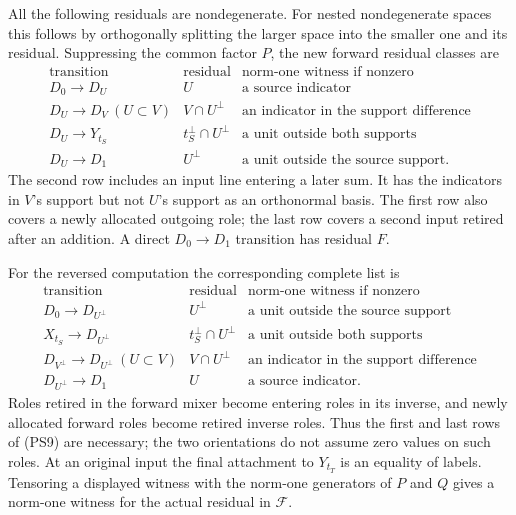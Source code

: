 All the following residuals are nondegenerate.  For nested nondegenerate
spaces this follows by orthogonally splitting the larger space into the
smaller one and its residual.  Suppressing the common factor $P$, the
new forward residual classes are
\[
\begin{array}{c|c|l}
\text{transition}&\text{residual}&\text{norm-one witness if nonzero}\\ \hline
D_0\to D_U&U&\text{a source indicator}\\
D_U\to D_V\ (U\subset V)&V\cap U^\perp
                              &\text{an indicator in the support difference}\\
D_U\to Y_{t_S}&t_S^\perp\cap U^\perp
                              &\text{a unit outside both supports}\\
D_U\to D_1&U^\perp&\text{a unit outside the source support}.
\end{array}                                                     \tag{PS8}
\]
The second row includes an input line entering a later sum.  It has the
indicators in $V$'s support but not $U$'s support as an orthonormal basis.
The first row also covers a newly allocated outgoing role; the last row
covers a second input retired after an addition.  A direct $D_0\to D_1$
transition has residual $F$.

For the reversed computation the corresponding complete list is
\[
\begin{array}{c|c|l}
\text{transition}&\text{residual}&\text{norm-one witness if nonzero}\\ \hline
D_0\to D_{U^\perp}&U^\perp&\text{a unit outside the source support}\\
X_{t_S}\to D_{U^\perp}&t_S^\perp\cap U^\perp
                              &\text{a unit outside both supports}\\
D_{V^\perp}\to D_{U^\perp}\ (U\subset V)&V\cap U^\perp
                              &\text{an indicator in the support difference}\\
D_{U^\perp}\to D_1&U&\text{a source indicator}.
\end{array}                                                     \tag{PS9}
\]
Roles retired in the forward mixer become entering roles in its inverse,
and newly allocated forward roles become retired inverse roles.  Thus the
first and last rows of (PS9) are necessary; the two orientations do not
assume zero values on such roles.  At an original input the final attachment
to $Y_{t_T}$ is an equality of labels.  Tensoring a displayed witness with
the norm-one generators of $P$ and $Q$ gives a norm-one witness for the
actual residual in $\mathcal F$.


